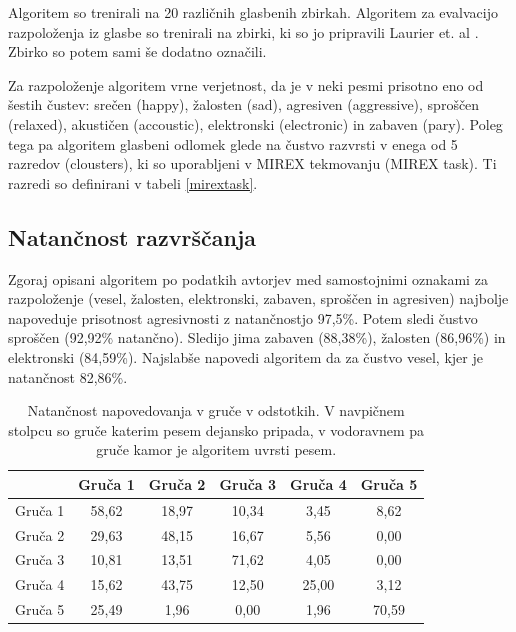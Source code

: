\documentclass[a4paper, 12pt]{book}
\begin{document}
{Algoritem so trenirali na 20 različnih glasbenih zbirkah. Algoritem za evalvacijo razpoloženja iz glasbe so trenirali na zbirki, ki so jo pripravili Laurier et. al \cite{laurier2010indexing}. Zbirko so potem sami še dodatno označili. 

Za razpoloženje algoritem vrne verjetnost, da je v neki pesmi prisotno eno od šestih čustev: srečen (happy), žalosten (sad), agresiven (aggressive), sproščen (relaxed), akustičen (accoustic), elektronski (electronic) in zabaven (pary). Poleg tega pa algoritem glasbeni odlomek glede na čustvo razvrsti v enega od 5 razredov (clousters), ki so uporabljeni v MIREX tekmovanju (MIREX task). Ti razredi so definirani v tabeli \ref{mirextask}.

\subsection{Natančnost razvrščanja}
\label{natancnostessentia}

Zgoraj opisani algoritem po podatkih avtorjev med samostojnimi oznakami za razpoloženje (vesel, žalosten, elektronski, zabaven, sproščen in agresiven) najbolje napoveduje prisotnost agresivnosti z natančnostjo 97,5\%. Potem sledi čustvo sproščen (92,92\% natančno). Sledijo jima zabaven (88,38\%), žalosten (86,96\%) in elektronski (84,59\%). Najslabše napovedi algoritem da za čustvo vesel, kjer je natančnost 82,86\%.

\begin{table}[htb]
\begin{center}
\caption{Natančnost napovedovanja v gruče v odstotkih. V navpičnem stolpcu so gruče katerim pesem dejansko pripada, v vodoravnem pa gruče kamor je algoritem uvrsti pesem.}
\begin{tabular}{|l|c|c|c|c|c|}
\hline
 & Gruča 1 & Gruča 2 & Gruča 3 & Gruča 4 & Gruča 5 \\ \hline
Gruča 1 & 58,62 & 18,97	& 10,34 & 3,45 & 8,62 \\ \hline
Gruča 2 & 29,63 & 48,15 & 16,67 & 5,56 & 0,00 \\ \hline
Gruča 3 & 10,81 & 13,51 & 71,62 & 4,05 & 0,00 \\ \hline
Gruča 4 & 15,62	& 43,75	& 12,50	& 25,00	& 3,12 \\ \hline
Gruča 5 & 25,49	& 1,96	& 0,00 & 1,96 & 70,59 \\ \hline

\hline
\end{tabular}
\label{natancnost_gruce}
\end{center}
\end{table}

}
\end{document}
